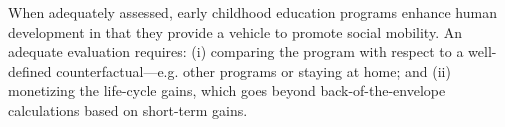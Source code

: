 When adequately assessed, early childhood education programs enhance human development in that they provide a vehicle to promote social mobility. An adequate evaluation requires: (i) comparing the program with respect to a well-defined counterfactual---e.g. other programs or staying at home; and (ii) monetizing the life-cycle gains, which goes beyond back-of-the-envelope calculations based on short-term gains.

\singlespace



 